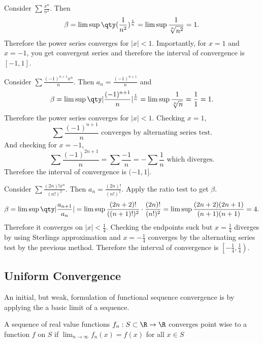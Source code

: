 \documentclass[../notes.tex]{subfiles}
\begin{document}
\begin{example}
    Consider $\sum \frac{x^n}{n^2}$. Then
    \[
    \beta = \limsup \qty(\frac{1}{n^2})^{\frac{1}{n}} = \limsup \frac{1}{\sqrt[n]{n^2}} = 1
    .\]
    Therefore the power series converges for $|x| < 1$. Importantly, for $x = 1$ and $x = -1$, you get convergent series and therefore the interval of convergence is $[-1,1]$.
\end{example}

\begin{example}
    Consider $\sum \frac{(-1)^{n+1} x^n}{n}$. Then $a_n = \frac{(-1)^{n+1}}{n}$ and
    \[
        \beta = \limsup \qty|\frac{(-1)^{n+1}}{n}|^{\frac{1}{n}} = \limsup \frac{1}{\sqrt[n]{n}} = \frac{1}{1} = 1
    .\]
    Therefore the power series converges for $|x| < 1$. Checking $x = 1$,
    \[
        \sum \frac{(-1)^{n+1}}{n} \text{ converges by alternating series test}
    .\]
    And checking for $x = -1$,
    \[
        \sum \frac{(-1)^{2n+1}}{n} = \sum \frac{-1}{n} = - \sum \frac{1}{n} \text{ which diverges}
    .\]
    Therefore the interval of convergence is $(-1, 1]$.
\end{example}

\begin{example}
    Consider $\sum \frac{(2n)! x^n}{(n!)^2}$. Then $a_n = \frac{(2n)!}{(n!)^2}$. Apply the ratio test to get $\beta$.
    \[
        \beta = \limsup \qty|\frac{a_{n+1}}{a_n}| = \limsup \frac{(2n+2)!}{((n+1)!)^2} \cdot \frac{(2n)!}{(n!)^2} = \limsup \frac{(2n+2)(2n+1)}{(n+1)(n+1)} = 4
    .\]
    Therefore it converges on $|x| < \frac{1}{4}$. Checking the endpoints suck but $x = \frac{1}{4}$ diverges by using Sterlings approximation and $x = -\frac{1}{4}$ converges by the alternating series test by the previous method. Therefore the interval of convergence is $\left[-\frac{1}{4}, \frac{1}{4} \right)$.
\end{example}

\subsection{Uniform Convergence}

An initial, but weak, formulation of functional sequence convergence is by applying the a basic limit of a sequence.

\begin{definition}
    A sequence of real value functions $f_n : S \subset \R \to \R$ converges point wise to a function $f$ on $S$ if $\lim_{n\to \infty} f_n(x) = f(x)$ for all $x \in S$
\end{definition}
\end{document}
